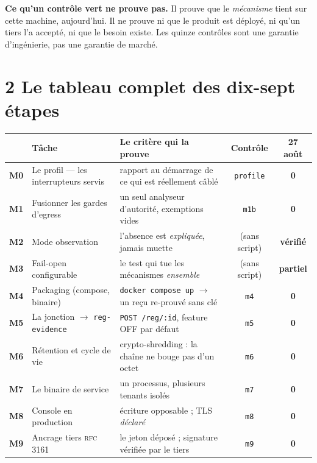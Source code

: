 \documentclass[11pt]{article}
\newcommand{\code}[1]{\texttt{\small #1}}
\newcommand{\best}[1]{{\color{efesolve}\textbf{#1}}}
\newcommand{\moyen}[1]{{\color{efeamber}\textbf{#1}}}
\newcommand{\mm}[1]{\textbf{#1}}
\newcommand{\sz}[1]{{\small #1}}
\begin{document}
\begin{cadre}
\textbf{Ce qu'un contrôle vert ne prouve pas.} Il prouve que le \emph{mécanisme} tient sur cette
machine, aujourd'hui. Il ne prouve ni que le produit est déployé, ni qu'un tiers l'a accepté, ni que
le besoin existe. Les quinze contrôles sont une garantie d'ingénierie, pas une garantie de marché.
\end{cadre}

\section{2 \;\textbar\; Le tableau complet des dix-sept étapes}

{\footnotesize
\renewcommand{\arraystretch}{1.18}
\setlength{\LTleft}{0pt}\setlength{\LTright}{0pt}
\begin{longtable}{@{}c >{\raggedright\arraybackslash}p{4.3cm} >{\raggedright\arraybackslash}p{5.5cm} c c@{}}
\toprule
& \textbf{Tâche} & \textbf{Le critère qui la prouve} & \textbf{Contrôle} & \textbf{27 août} \\
\midrule
\endhead
\mm{M0} & Le profil --- les interrupteurs servis & rapport au démarrage de ce qui est réellement câblé & \code{profile} & \best{0} \\
\mm{M1} & Fusionner les gardes d'egress & un seul analyseur d'autorité, exemptions vides & \code{m1b} & \best{0} \\
\mm{M2} & Mode observation & l'absence est \emph{expliquée}, jamais muette & \sz{(sans script)} & \best{vérifié} \\
\mm{M3} & Fail-open configurable & le test qui tue les mécanismes \emph{ensemble} & \sz{(sans script)} & \moyen{partiel} \\
\mm{M4} & Packaging \sz{(compose, binaire)} & \code{docker compose up} $\rightarrow$ un reçu re-prouvé sans clé & \code{m4} & \best{0} \\
\mm{M5} & La jonction $\rightarrow$ \code{reg-evidence} & \code{POST /reg/:id}, feature OFF par défaut & \code{m5} & \best{0} \\
\mm{M6} & Rétention et cycle de vie & crypto-shredding : la chaîne ne bouge pas d'un octet & \code{m6} & \best{0} \\
\mm{M7} & Le binaire de service & un processus, plusieurs tenants isolés & \code{m7} & \best{0} \\
\mm{M8} & Console en production & écriture opposable ; TLS \emph{déclaré} & \code{m8} & \best{0} \\
\mm{M9} & Ancrage tiers \textsc{rfc 3161} & le jeton déposé ; signature vérifiée par le tiers & \code{m9} & \best{0} \\

\end{longtable}}
\end{document}
